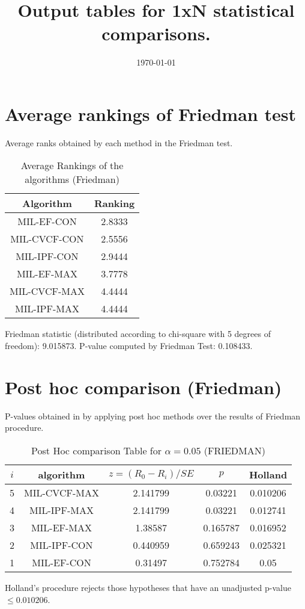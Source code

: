 \documentclass[a4paper,10pt]{article}
\title{Output tables for 1xN statistical comparisons.}
\author{}
\date{\today}
\begin{document}
\begin{landscape}
\pagestyle{empty}
\maketitle
\thispagestyle{empty}

\section{Average rankings of Friedman test}


Average ranks obtained by each method in the Friedman test.

\begin{table}[!htp]
\centering
\begin{tabular}{|c|c|}\hline
Algorithm&Ranking\\\hline
MIL-EF-CON&2.8333\\MIL-CVCF-CON&2.5556\\MIL-IPF-CON&2.9444\\MIL-EF-MAX&3.7778\\MIL-CVCF-MAX&4.4444\\MIL-IPF-MAX&4.4444\\\hline\end{tabular}
\caption{Average Rankings of the algorithms (Friedman)}
\end{table}

Friedman statistic (distributed according to chi-square with 5 degrees of freedom): 9.015873. \newline P-value computed by Friedman Test: 0.108433.\newline


\newpage

\section{Post hoc comparison (Friedman)}


P-values obtained in by applying post hoc methods over the results of Friedman procedure.

\begin{table}[!htp]
\centering\footnotesize
\begin{tabular}{ccccc}
$i$&algorithm&$z=(R_0 - R_i)/SE$&$p$&Holland\\
\hline5&MIL-CVCF-MAX&2.141799&0.03221&0.010206\\4&MIL-IPF-MAX&2.141799&0.03221&0.012741\\3&MIL-EF-MAX&1.38587&0.165787&0.016952\\2&MIL-IPF-CON&0.440959&0.659243&0.025321\\1&MIL-EF-CON&0.31497&0.752784&0.05\\\hline
\end{tabular}
\caption{Post Hoc comparison Table for $\alpha=0.05$ (FRIEDMAN)}
\end{table}Holland's procedure rejects those hypotheses that have an unadjusted p-value $\le0.010206$.



\end{landscape}
\end{document}
